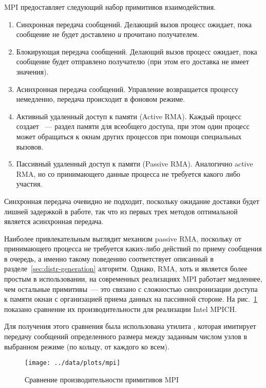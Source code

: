 MPI предоставляет следующий набор примитивов взаимодействия.

\begin{enumerate}
\item Синхронная передача сообщений. Делающий вызов процесс ожидает, пока сообщение не
  будет доставлено \emph{и} прочитано получателем.
\item Блокирующая передача сообщений. Делающий вызов процесс ожидает, пока сообщение будет
  отправлено получателю (при этом его доставка не имеет значения).
\item Асинхронная передача сообщений. Управление возвращается процессу немедленно,
  передача происходит в фоновом режиме.
\item Активный удаленный доступ к памяти (Active RMA). Каждый процесс создает
  ~--- раздел памяти для всеобщего доступа, при этом один процесс может
  обращаться к окнам других процессов при помощи специальных вызовов.
\item Пассивный удаленный доступ к памяти (Passive RMA). Аналогично active RMA, но со
  принимающего данные процесса не требуется какого либо участия.
\end{enumerate}

Синхронная передача очевидно не подходит, поскольку ожидание доставки будет лишней
задержкой в работе, так что из первых трех методов оптимальной является асинхронная
передача.

Наиболее привлекательным выглядит механизм passive RMA, поскольку от принимающего процесса
не требуется каких-либо действий по приему сообщения в очередь, а именно такому поведению
соответствует описанный в разделе~\ref{sec:distr-generation} алгоритм. Однако, RMA, хоть и
является более простым в использовании, на современных реализациях MPI работает медленнее,
чем остальные примитивы~--- это связано с сложностью синхронизации доступа к памяти окнаи
с организацией приема данных на пассивной стороне. На рис.~\ref{fig:mpi-primitives}
показано сравнение их производительности для реализации Intel MPICH.

Для получения этого сравнения была использована утилита , которая имитирует
передачу сообщений определенного размера между заданным числом узлов в выбранном режиме
(по кольцу, от каждого ко всем\etc).

\begin{figure}[ht]
  \centering
  \texttt{[image: ../data/plots/mpi]}
  \caption{Сравнение производительности примитивов MPI}
  \label{fig:mpi-primitives}
\end{figure}


